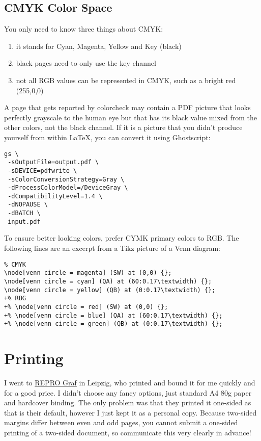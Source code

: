 \subsection{CMYK Color Space}
You only need to know three things about CMYK:

\begin{enumerate}
\item it stands for Cyan, Magenta, Yellow and Key (black)
\item black pages need to only use the key channel
\item not all RGB values can be represented in CMYK, such as a bright red (255,0,0)
\end{enumerate}

A page that gets reported by colorcheck may contain a PDF picture that looks perfectly grayscale to the human eye but that has its black value mixed from the other colors, not the black channel.
If it is a picture that you didn't produce yourself from within LaTeX, you can convert it using Ghostscript:

\begin{lstlisting}
gs \
 -sOutputFile=output.pdf \
 -sDEVICE=pdfwrite \
 -sColorConversionStrategy=Gray \
 -dProcessColorModel=/DeviceGray \
 -dCompatibilityLevel=1.4 \
 -dNOPAUSE \
 -dBATCH \
 input.pdf 
\end{lstlisting}

To ensure better looking colors, prefer CYMK primary colors to RGB.
The following lines are an excerpt from a Tikz picture of a Venn diagram:

\begin{lstlisting}
% CMYK
\node[venn circle = magenta] (SW) at (0,0) {};
\node[venn circle = cyan] (QA) at (60:0.17\textwidth) {};
\node[venn circle = yellow] (QB) at (0:0.17\textwidth) {};
+% RBG
+% \node[venn circle = red] (SW) at (0,0) {};
+% \node[venn circle = blue] (QA) at (60:0.17\textwidth) {};
+% \node[venn circle = green] (QB) at (0:0.17\textwidth) {};
\end{lstlisting}

\section{Printing}
I went to \href{https://reprograf-leipzig.de/}{REPRO Graf} in Leipzig, who printed and bound it for me quickly and for a good price.
I didn't choose any fancy options, just standard A4 80g paper and hardcover binding.
The only problem was that they printed it one-sided as that is their default, however I just kept it as a personal copy.
Because two-sided margins differ between even and odd pages, you cannot submit a one-sided printing of a two-sided document, so communicate this very clearly in advance!
